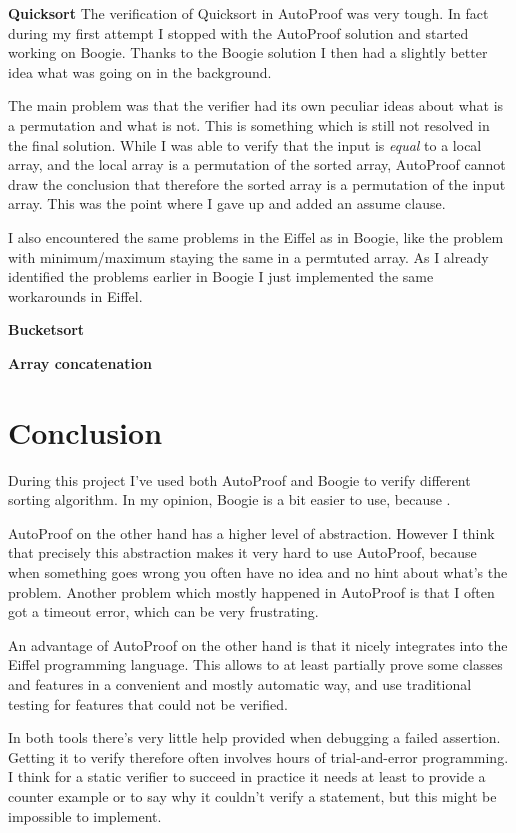 \documentclass[a4paper,10pt]{article}
\begin{document}
\textbf{Quicksort}
The verification of Quicksort in AutoProof was very tough.
In fact during my first attempt I stopped with the AutoProof solution and started working on Boogie.
Thanks to the Boogie solution I then had a slightly better idea what was going on in the background.

The main problem was that the verifier had its own peculiar ideas about what is a permutation and what is not.
This is something which is still not resolved in the final solution.
While I was able to verify that the input is \emph{equal} to a local array, and the local array is a permutation of the sorted array, 
AutoProof cannot draw the conclusion that therefore the sorted array is a permutation of the input array.
This was the point where I gave up and added an assume clause.

I also encountered the same problems in the Eiffel as in Boogie, like the problem with minimum/maximum staying the same in a permtuted array.
As I already identified the problems earlier in Boogie I just implemented the same workarounds in Eiffel.

\textbf{Bucketsort}

\textbf{Array concatenation}

\section {Conclusion}

During this project I've used both AutoProof and Boogie to verify different sorting algorithm.
In my opinion, Boogie is a bit easier to use, because .

AutoProof on the other hand has a higher level of abstraction.
However I think that precisely this abstraction makes it very hard to use AutoProof, 
because when something goes wrong you often have no idea and no hint about what's the problem.
Another problem which mostly happened in AutoProof is that I often got a timeout error, which can be very frustrating.

An advantage of AutoProof on the other hand is that it nicely integrates into the Eiffel programming language.
This allows to at least partially prove some classes and features in a convenient and mostly automatic way, 
and use traditional testing for features that could not be verified.

In both tools there's very little help provided when debugging a failed assertion.
Getting it to verify therefore often involves hours of trial-and-error programming.
I think for a static verifier to succeed in practice it needs at least to provide a counter example 
or to say why it couldn't verify a statement, but this might be impossible to implement.
\end{document}
